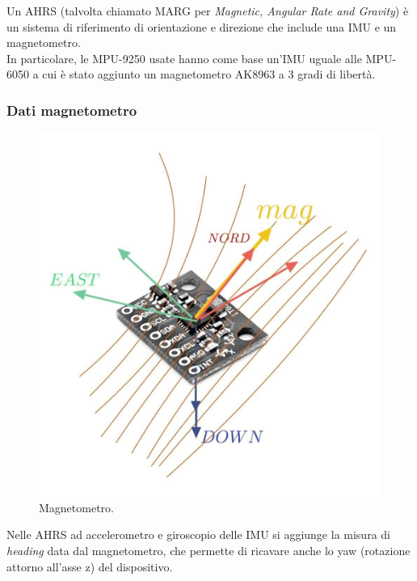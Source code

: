 Un AHRS (talvolta chiamato MARG per \textit{Magnetic, Angular Rate and Gravity}) è un sistema di riferimento di orientazione e direzione che include una IMU e un magnetometro.\\
In particolare, le MPU-9250 usate hanno come base un'IMU uguale alle MPU-6050 a cui è stato aggiunto un magnetometro AK8963 a 3 gradi di libertà.

\subsubsection{Dati magnetometro}\label{Dati magnetometro}

\begin{figure}[H]
    \includegraphics[scale=0.25]{immagini/IMU_sdr_magn.jpg}
    \centering
    \caption{Magnetometro.}
\end{figure}

Nelle AHRS ad accelerometro e giroscopio delle IMU si aggiunge la misura di \textit{heading} data dal magnetometro, che permette di ricavare anche lo yaw (rotazione attorno all'asse z) del dispositivo.\\

